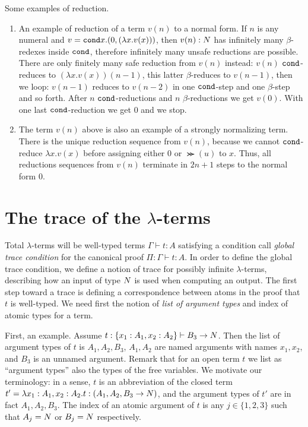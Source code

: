 \documentclass{article}
\begin{document}
Some examples of reduction.
\begin{enumerate}
\item
An example of reduction of a term $v(n)$ to a normal form. 
If $n$ is any numeral and $v = {\tt cond} x. (0, (\lambda x.v(x)) )$, then 
$v(n): {N}$ has infinitely many $\beta$-redexes inside 
${\tt cond}$, therefore infinitely many unsafe reductions are possible. There are only finitely many safe reduction
from $v(n)$ instead: $v(n)$ ${\tt cond}$-reduces to $(\lambda x.v(x))(n-1)$, 
this latter $\beta$-reduces to $v(n-1)$, 
then we loop: $v(n-1)$ reduces to $v(n-2)$ in one ${\tt cond}$-step and one $\beta$-step and so forth.
After $n$ ${\tt cond}$-reductions and 
$n$ $\beta$-reductions we get $v(0)$. With one last ${\tt cond}$-reduction we get $0$ and we stop. 
\item
The term $v(n)$ above is also an example of a strongly normalizing term.
There is the unique reduction sequence from $v(n)$, because we cannot ${\tt cond}$-reduce $\lambda x.v(x)$
before assigning either $0$ or $\Succ(u)$ to $x$. 
Thus, all reductions sequences from $v(n)$ terminate in $2n+1$ steps to the normal form $0$.
\end{enumerate}


\section{The trace of the $\lambda$-terms}
Total $\lambda$-terms will be well-typed terms $\Gamma \vdash t:A$ 
satisfying a condition call \emph{global trace condition} for the canonical proof 
$\Pi:\Gamma \vdash t:A$.
In order to define the global trace condition, 
we define a notion of trace for possibly infinite $\lambda$-terms, describing how an input of type ${N}$
is used when computing an output.
The first step toward a trace is defining a correspondence between atoms in the
proof that $t$ is well-typed. We need first the notion of \emph{list of argument
 types} and index of atomic types for a term.

First, an example.
Assume $t : \{x_1:A_1, x_2:A_2\} \vdash B_3 \rightarrow {N}$. Then the list of argument types of $t$
is $A_1, A_2, B_3$, $A_1,A_2$ are named arguments with names $x_1, x_2$, and $B_3$ is an unnamed
argument. Remark that for an open term $t$ we list as ``argument types'' also the
types of the free variables. We motivate our terminology:
in a sense, $t$ is an abbreviation of the closed term $t' = \lambda  
x_1:A_1, x_2:A_2.t: (  A_1,A_2,B_3 \rightarrow {N} )$, and the argument types of $t'$ are
in fact $A_1, A_2, B_3$. 
The index of an atomic argument of $t$ is any $j \in \{1,2,3\}$ such that $A_j={N}$
or $B_j={N}$ respectively.
\end{document}
